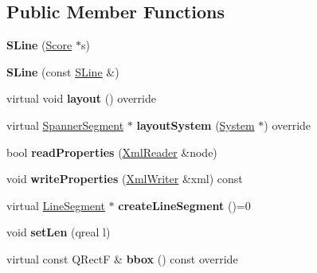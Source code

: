 \subsection*{Public Member Functions}
\begin{DoxyCompactItemize}
\item 
\mbox{\label{class_ms_1_1_s_line_aebafe8d24326b5306a8ad57302b3a3a5}} 
{\bfseries S\+Line} (\hyperlink{class_ms_1_1_score}{Score} $\ast$s)
\item 
\mbox{\label{class_ms_1_1_s_line_abba31f87c3fdd58b5700494a55ffb99f}} 
{\bfseries S\+Line} (const \hyperlink{class_ms_1_1_s_line}{S\+Line} \&)
\item 
\mbox{\label{class_ms_1_1_s_line_ad159c724c4d23a69f6f667bf3c1caafa}} 
virtual void {\bfseries layout} () override
\item 
\mbox{\label{class_ms_1_1_s_line_a556e180224ecc6f8fd9d5378aad8868b}} 
virtual \hyperlink{class_ms_1_1_spanner_segment}{Spanner\+Segment} $\ast$ {\bfseries layout\+System} (\hyperlink{class_ms_1_1_system}{System} $\ast$) override
\item 
\mbox{\label{class_ms_1_1_s_line_a6d81e9bd52bf02014ada268588aed597}} 
bool {\bfseries read\+Properties} (\hyperlink{class_ms_1_1_xml_reader}{Xml\+Reader} \&node)
\item 
\mbox{\label{class_ms_1_1_s_line_ac4112921ebd4e1e95b0dfa8a709cda62}} 
void {\bfseries write\+Properties} (\hyperlink{class_ms_1_1_xml_writer}{Xml\+Writer} \&xml) const
\item 
\mbox{\label{class_ms_1_1_s_line_a5d52db4a120c0a1991803fdb5f8039c9}} 
virtual \hyperlink{class_ms_1_1_line_segment}{Line\+Segment} $\ast$ {\bfseries create\+Line\+Segment} ()=0
\item 
\mbox{\label{class_ms_1_1_s_line_a4a00ae29b2365db01237f6a1da2a36cf}} 
void {\bfseries set\+Len} (qreal l)
\item 
\mbox{\label{class_ms_1_1_s_line_a305923ccdcc56aa1ece912877c8e8179}} 
virtual const Q\+RectF \& {\bfseries bbox} () const override

\end{DoxyCompactItemize}
